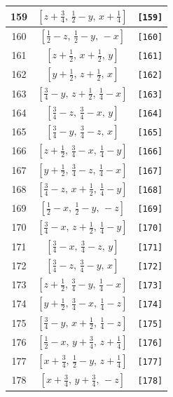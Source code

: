 \documentclass[fleqn,8pt]{jsarticle}
\begin{document}
\begin{longtable}{ccc}
159 & $\left[ z + \frac{3}{4},\, \frac{1}{2} - y,\, x + \frac{1}{4} \right]$ & {\tt [159]} \\ \hline
160 & $\left[ \frac{1}{2} - z,\, \frac{1}{2} - y,\, - x \right]$ & {\tt [160]} \\ \hline
161 & $\left[ z + \frac{1}{2},\, x + \frac{1}{2},\, y \right]$ & {\tt [161]} \\ \hline
162 & $\left[ y + \frac{1}{2},\, z + \frac{1}{2},\, x \right]$ & {\tt [162]} \\ \hline
163 & $\left[ \frac{3}{4} - y,\, z + \frac{1}{2},\, \frac{1}{4} - x \right]$ & {\tt [163]} \\ \hline
164 & $\left[ \frac{3}{4} - z,\, \frac{3}{4} - x,\, y \right]$ & {\tt [164]} \\ \hline
165 & $\left[ \frac{3}{4} - y,\, \frac{3}{4} - z,\, x \right]$ & {\tt [165]} \\ \hline
166 & $\left[ z + \frac{1}{2},\, \frac{3}{4} - x,\, \frac{1}{4} - y \right]$ & {\tt [166]} \\ \hline
167 & $\left[ y + \frac{1}{2},\, \frac{3}{4} - z,\, \frac{1}{4} - x \right]$ & {\tt [167]} \\ \hline
168 & $\left[ \frac{3}{4} - z,\, x + \frac{1}{2},\, \frac{1}{4} - y \right]$ & {\tt [168]} \\ \hline
169 & $\left[ \frac{1}{2} - x,\, \frac{1}{2} - y,\, - z \right]$ & {\tt [169]} \\ \hline
170 & $\left[ \frac{3}{4} - x,\, z + \frac{1}{2},\, \frac{1}{4} - y \right]$ & {\tt [170]} \\ \hline
171 & $\left[ \frac{3}{4} - x,\, \frac{3}{4} - z,\, y \right]$ & {\tt [171]} \\ \hline
172 & $\left[ \frac{3}{4} - z,\, \frac{3}{4} - y,\, x \right]$ & {\tt [172]} \\ \hline
173 & $\left[ z + \frac{1}{2},\, \frac{3}{4} - y,\, \frac{1}{4} - x \right]$ & {\tt [173]} \\ \hline
174 & $\left[ y + \frac{1}{2},\, \frac{3}{4} - x,\, \frac{1}{4} - z \right]$ & {\tt [174]} \\ \hline
175 & $\left[ \frac{3}{4} - y,\, x + \frac{1}{2},\, \frac{1}{4} - z \right]$ & {\tt [175]} \\ \hline
176 & $\left[ \frac{1}{2} - x,\, y + \frac{3}{4},\, z + \frac{1}{4} \right]$ & {\tt [176]} \\ \hline
177 & $\left[ x + \frac{3}{4},\, \frac{1}{2} - y,\, z + \frac{1}{4} \right]$ & {\tt [177]} \\ \hline
178 & $\left[ x + \frac{3}{4},\, y + \frac{3}{4},\, - z \right]$ & {\tt [178]} \\ \hline

\end{longtable}
\end{document}
